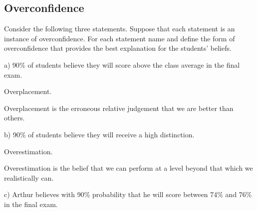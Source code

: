 \documentclass[
  letterpaper,
  DIV=11,
  numbers=noendperiod]{scrreprt}
\begin{document}
\hypertarget{overconfidence-1}{%
\subsection{Overconfidence}\label{overconfidence-1}}

Consider the following three statements. Suppose that each statement is
an instance of overconfidence. For each statement name and define the
form of overconfidence that provides the best explanation for the
students' beliefs.

a) 90\% of students believe they will score above the class average in
the final exam.

\begin{tcolorbox}[enhanced jigsaw, title=\textcolor{quarto-callout-tip-color}{\faLightbulb}\hspace{0.5em}{Answer}, toprule=.15mm, colback=white, breakable, titlerule=0mm, colframe=quarto-callout-tip-color-frame, coltitle=black, opacityback=0, rightrule=.15mm, colbacktitle=quarto-callout-tip-color!10!white, bottomtitle=1mm, opacitybacktitle=0.6, arc=.35mm, bottomrule=.15mm, toptitle=1mm, leftrule=.75mm, left=2mm]

Overplacement.

Overplacement is the erroneous relative judgement that we are better
than others.

\end{tcolorbox}

b) 90\% of students believe they will receive a high distinction.

\begin{tcolorbox}[enhanced jigsaw, title=\textcolor{quarto-callout-tip-color}{\faLightbulb}\hspace{0.5em}{Answer}, toprule=.15mm, colback=white, breakable, titlerule=0mm, colframe=quarto-callout-tip-color-frame, coltitle=black, opacityback=0, rightrule=.15mm, colbacktitle=quarto-callout-tip-color!10!white, bottomtitle=1mm, opacitybacktitle=0.6, arc=.35mm, bottomrule=.15mm, toptitle=1mm, leftrule=.75mm, left=2mm]

Overestimation.

Overestimation is the belief that we can perform at a level beyond that
which we realistically can.

\end{tcolorbox}

c) Arthur believes with 90\% probability that he will score between 74\%
and 76\% in the final exam.
\end{document}
